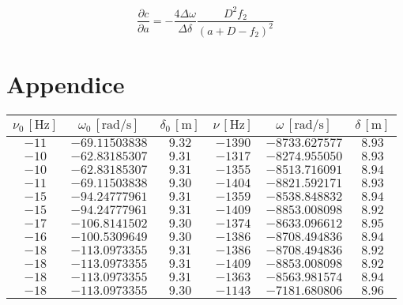 \documentclass{article} %
\let\oldsection\section%
\renewcommand{\section}{%
	\renewcommand{\theequation}{\thesection.\arabic{equation}}%
	\oldsection}%
\begin{document}
    \begin{equation}
        \label{eqn:propa}
        \frac{\partial c}{\partial a} = -\frac{4\Delta \omega}{\Delta \delta} \frac{D^2 f_2}{(a + D -f_2)^2}
        \end{equation}

    \section{Appendice}

    \begin{table}
        \centering
        \begin{tabular}{||c|c|c||c|c|c||}
            \hline
            $\nu_0 \, [\text{Hz}]$ & $\omega_0 \, [\text{rad/s}]$ &  $\delta_0 \,[\text{m}]$ &  $\nu \,[\text{Hz}]$ & $\omega \,[\text{rad/s}]$ & $\delta \, [\text{m}]$ \\
            \hline\hline
            $-11 $ & $-69.11503838 $ & $ 9.32 $ & $ -1390 $ & $ -8733.627577 $ & $  8.93 $ \\\hline
            $-10 $ & $-62.83185307 $ & $ 9.31 $ & $ -1317 $ & $ -8274.955050 $ & $  8.93 $ \\\hline
            $-10 $ & $-62.83185307 $ & $ 9.31 $ & $ -1355 $ & $ -8513.716091 $ & $  8.94 $ \\\hline
            $-11 $ & $-69.11503838 $ & $ 9.30 $ & $ -1404 $ & $ -8821.592171 $ & $  8.93 $ \\\hline
            $-15 $ & $-94.24777961 $ & $ 9.31 $ & $ -1359 $ & $ -8538.848832 $ & $  8.94 $ \\\hline
            $-15 $ & $-94.24777961 $ & $ 9.31 $ & $ -1409 $ & $ -8853.008098 $ & $  8.92 $ \\\hline
            $-17 $ & $-106.8141502 $ & $ 9.30 $ & $ -1374 $ & $ -8633.096612 $ & $  8.95 $ \\\hline
            $-16 $ & $-100.5309649 $ & $ 9.30 $ & $ -1386 $ & $ -8708.494836 $ & $  8.94 $ \\\hline
            $-18 $ & $-113.0973355 $ & $ 9.31 $ & $ -1386 $ & $ -8708.494836 $ & $  8.92 $ \\\hline
            $-18 $ & $-113.0973355 $ & $ 9.31 $ & $ -1409 $ & $ -8853.008098 $ & $  8.92 $ \\\hline
            $-18 $ & $-113.0973355 $ & $ 9.31 $ & $ -1363 $ & $ -8563.981574 $ & $  8.94 $ \\\hline
            $-18 $ & $-113.0973355 $ & $ 9.30 $ & $ -1143 $ & $ -7181.680806 $ & $  8.96 $ \\\hline

\end{tabular}
\end{table}
\end{document}

